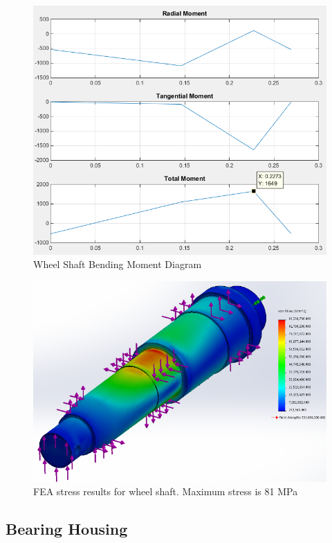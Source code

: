 \begin{figure}[H]
\centering
\includegraphics[width=\textwidth]{images/wheelshaft_bmd}
\caption{Wheel Shaft Bending Moment Diagram}
\label{fig:wheel_shaft_bmd}
\end{figure}

\begin{figure}[H]
\centering
\includegraphics[width=\textwidth]{images/wheel_shaft_fea}
\caption[Wheel Shaft FEA Stress Results]{FEA stress results for wheel shaft. Maximum stress is 81 MPa}
\label{fig:wheel_shaft_stress_fea}
\end{figure}

\subsection{Bearing Housing}\label{sec:bh_fea}

